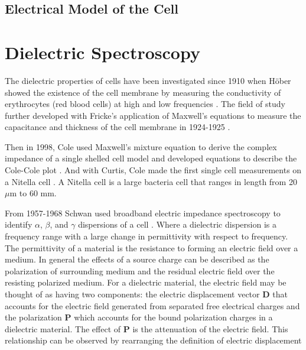  
 \subsection{Electrical Model of the Cell}
 
 
 \section{Dielectric Spectroscopy}

 
 \par The dielectric properties of cells have been investigated since 1910 when H\"{o}ber showed the existence of the cell membrane by measuring the conductivity of erythrocytes (red blood cells) at high and low frequencies \cite{hober_r_methode_1910}. The field of study further developed with Fricke's application of Maxwell's equations to measure the capacitance and thickness of the cell membrane in 1924-1925 \cite{james_clerk_maxwell_treatise_1892, fricke_h_mathematical_1924, fricke_h_electric_1924, fricke_h_electric_1931}. 
 
 \par Then in 1998, Cole used Maxwell's mixture equation to derive the complex impedance of a single shelled cell model and developed equations to describe the Cole-Cole plot \cite{cole_electric_1928}. And with Curtis, Cole made the first single cell measurements on a Nitella cell \cite{curtis_transverse_1937}. A Nitella cell is a large bacteria cell that ranges in length from 20 $\mu$m to 60 mm. 
 
 \par From 1957-1968 Schwan used broadband electric impedance spectroscopy to identify $\alpha$, $\beta$, and $\gamma$ dispersions of a cell \cite{schwan_h_p_electrical_1957,schwan_h_p_electrical_1963,schwan_electrical_1994}. Where a dielectric dispersion is a frequency range with a large change in permittivity with respect to frequency. The permittivity of a material is the resistance to forming an electric field over a medium. In general the effects of a source charge can be described as the polarization of surrounding medium and the residual electric field over the resisting polarized medium. For a dielectric material, the electric field may be thought of as having two components: the electric displacement vector $\boldsymbol{D}$ that accounts for the electric field generated from separated free electrical charges and the polarization $\boldsymbol{P}$ which accounts for the bound polarization charges in a dielectric material. The effect of $\boldsymbol{P}$ is the attenuation of the electric field. This relationship can be observed by rearranging the definition of electric displacement
 
